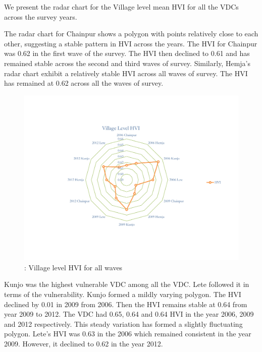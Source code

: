 We present the radar chart for the Village level mean HVI for all the VDCs across the survey years.\par 

The radar chart for Chainpur shows a polygon with points relatively close to each other, suggesting a stable pattern in HVI across the years. The HVI for Chainpur was 0.62 in the first wave of the survey. The HVI then declined to 0.61 and has remained stable across the second and third waves of survey. Similarly, Hemja's radar chart exhibit a relatively stable HVI across all waves of survey. The HVI has remained at 0.62 across all the waves of survey.\par 

\begin{center}
	\begin{figure}[htb]
		\includegraphics[scale=0.62]{figure/HVI_Summary_VDC.pdf}
		\vspace{-1.5cm}
		\caption{: Village level HVI for all waves} 
		\label{fig:vdchvisummary}
		\setlength{\belowcaptionskip}{6pt}
	\end{figure}
\end{center}

Kunjo was the highest vulnerable VDC among all the VDC. Lete followed it in terms of the vulnerability. Kunjo formed a mildly varying polygon. The HVI declined by 0.01 in 2009 from 2006. Then the HVI remains stable at 0.64 from year 2009 to 2012. The VDC had 0.65, 0.64 and 0.64 HVI in the year 2006, 2009 and 2012 respectively. This steady variation has formed a slightly fluctuating polygon.  Lete's HVI was 0.63 in the 2006 which remained consistent in the year 2009. However, it declined to 0.62 in the year 2012.   

